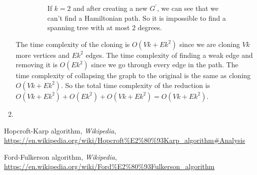 \documentclass{article}
\begin{document}
\begin{enumerate}
\begin{enumerate}
\begin{figure}[H]
\begin{minipage}{0.3\textwidth}
                \caption{If $k=2$ and after creating a new $G^\prime$, we can see that we can't find a Hamiltonian path. So it is impossible to find a spanning tree with at most $2$ degrees.}
            \end{minipage}
        \end{figure}
    \end{enumerate}

    The time complexity of the cloning is $O(Vk+Ek^2)$ since we are cloning $Vk$ more vertices and $Ek^2$ edges.
    The time complexity of finding a weak edge and removing it is $O(Ek^2)$ since we go through every edge in the path.
    The time complexity of collapsing the graph to the original is the same as cloning $O(Vk+Ek^2)$.
    So the total time complexity of the reduction is $O(Vk+Ek^2)+O(Ek^2)+O(Vk+Ek^2)=O(Vk+Ek^2)$.

    \item
    
\end{enumerate}

\begin{thebibliography}{9}
    
    Hopcroft-Karp algorithm, \emph{Wikipedia}, \url{https://en.wikipedia.org/wiki/Hopcroft%E2%80%93Karp_algorithm#Analysis}
    
    Ford-Fulkerson algorithm, \emph{Wikipedia}, \url{https://en.wikipedia.org/wiki/Ford%E2%80%93Fulkerson_algorithm}

    
    
    \end{thebibliography}
\end{document}
